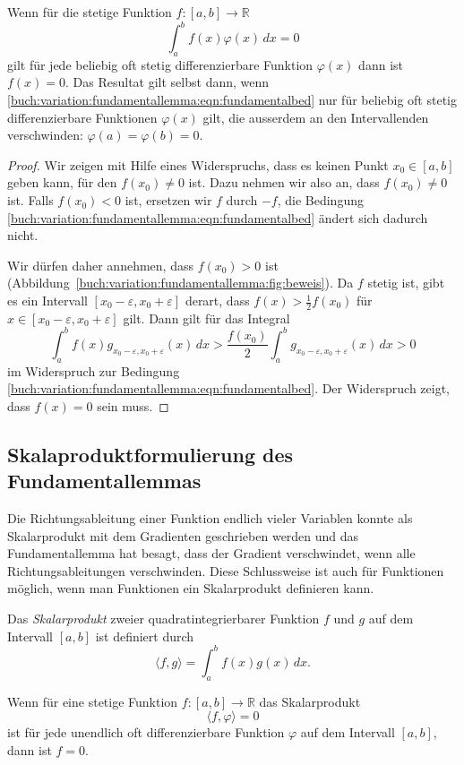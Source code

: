 \begin{satz}[Fundamentallemma]
\label{buch:variation:fundamentallemma:satz:fundamentallemma}
Wenn für die stetige Funktion $f\colon[a,b]\to\mathbb{R}$ 
\begin{equation}
\int_a^b f(x)\varphi(x)\,dx = 0
\label{buch:variation:fundamentallemma:eqn:fundamentalbed}
\end{equation}
gilt für jede beliebig oft stetig differenzierbare Funktion $\varphi(x)$ 
dann ist $f(x)=0$.
Das Resultat gilt selbst dann, wenn
\eqref{buch:variation:fundamentallemma:eqn:fundamentalbed}
nur für beliebig oft stetig differenzierbare Funktionen $\varphi(x)$ 
gilt, die ausserdem an den Intervallenden verschwinden:
$\varphi(a)=\varphi(b)=0$.
\end{satz}

\begin{proof}
Wir zeigen mit Hilfe eines Widerspruchs, dass es keinen Punkt $x_0\in[a,b]$
geben kann, für den $f(x_0)\ne 0$ ist.
Dazu nehmen wir also an, dass $f(x_0)\ne 0$ ist.
Falls $f(x_0)<0$ ist, ersetzen wir $f$ durch $-f$, 
die Bedingung
\eqref{buch:variation:fundamentallemma:eqn:fundamentalbed}
ändert sich dadurch nicht.

Wir dürfen daher annehmen, dass $f(x_0)>0$ ist
(Abbildung~\ref{buch:variation:fundamentallemma:fig:beweis}).
Da $f$ stetig ist, gibt es ein Intervall $[x_0-\varepsilon,x_0+\varepsilon]$
derart, dass $f(x)> \frac12 f(x_0)$ für
$x\in[x_0-\varepsilon,x_0+\varepsilon]$ gilt.
Dann gilt für das Integral
\[
\int_a^b
f(x)
g_{x_0-\varepsilon,x_0+\varepsilon} (x)
\,dx
>
\frac{f(x_0)}{2}
\int_a^b
g_{x_0-\varepsilon,x_0+\varepsilon} (x)
\,dx
>
0
\]
im Widerspruch zur Bedingung
\eqref{buch:variation:fundamentallemma:eqn:fundamentalbed}.
Der Widerspruch zeigt, dass $f(x)=0$ sein muss.
\end{proof}

%
%
\subsection{Skalaproduktformulierung des Fundamentallemmas}
Die Richtungsableitung einer Funktion endlich vieler Variablen 
konnte als Skalarprodukt mit dem Gradienten geschrieben werden und
das Fundamentallemma hat besagt, dass der Gradient verschwindet,
wenn alle Richtungsableitungen verschwinden.
Diese Schlussweise ist auch für Funktionen möglich, wenn man Funktionen
ein Skalarprodukt definieren kann.

\begin{definition}[$L^2$-Skalarprodukt]
Das {\em Skalarprodukt} zweier quadratintegrierbarer Funktion $f$ und $g$
auf dem Intervall $[a,b]$ ist definiert durch
\[
\langle f,g\rangle
=
\int_a^b f(x)g(x)\,dx.
\]
\end{definition}

\begin{satz}
Wenn für eine stetige Funktion $f\colon[a,b]\to\mathbb{R}$ das Skalarprodukt
\[
\langle f,\varphi\rangle = 0
\]
ist für jede unendlich oft differenzierbare Funktion $\varphi$ auf dem
Intervall $[a,b]$, dann ist $f=0$.
\end{satz}


